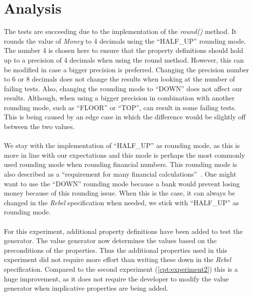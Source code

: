 \section{Analysis}
The tests are succeeding due to the implementation of the \textit{round()}
method. It rounds the value of \textit{Money} to 4 decimals using the
``HALF\_UP'' rounding mode. The number 4 is chosen here to ensure that the
property definitions should hold up to a precision of 4 decimals when using the
round method. However, this can be modified in case a bigger precision is
preferred. Changing the precision number to 6 or 8 decimals does not change the
results when looking at the number of failing tests. Also, changing the rounding
mode to ``DOWN'' does not affect our results. Although, when using a bigger precision in
combination with another rounding mode, such as ``FLOOR'' or ``TOP'', can result
in some failing tests. This is being caused by an edge case in which the
difference would be slightly off between the two values.\\
\\
We stay with the implementation of ``HALF\_UP'' as rounding mode, as this is
more in line with our expectations and this mode is perhaps the most commonly
used rounding mode when rounding financial numbers. This rounding mode is also
described as a
``requirement for many financial calculations''~\cite{cowlishaw2003decimal}. One
might want to use the ``DOWN'' rounding mode because a bank would prevent losing
money because of this rounding issue. When this is the case, it can always be
changed in the \textit{Rebel} specification when needed, we stick with
``HALF\_UP'' as rounding mode.\\
\\
For this experiment, additional property definitions have been added to test the
generator. The value generator now determines the values based on the
preconditions of the properties. Thus the additional properties used in this
experiment did not require more effort than writing these down in the \textit{Rebel}
specification. Compared to the second experiment (\autoref{cpt:experiment2})
this is a huge improvement, as it does not require the developer to modify the
value generator when implicative properties are being added.\\

